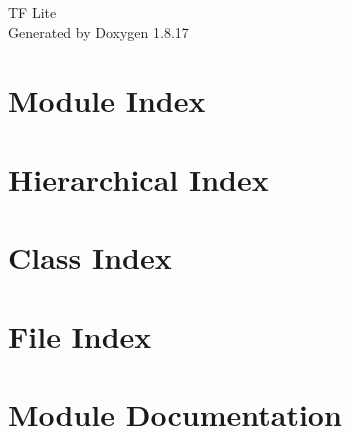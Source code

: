 \let\mypdfximage\pdfximage\def\pdfximage{\immediate\mypdfximage}\documentclass[twoside]{book}
\newcommand{\+}{\discretionary{\mbox{\scriptsize$\hookleftarrow$}}{}{}}
\newcommand{\clearemptydoublepage}{%
  \newpage{\pagestyle{empty}\cleardoublepage}%
}
\begin{document}
\hypersetup{pageanchor=false,
             bookmarksnumbered=true,
             pdfencoding=unicode
            }
\begin{titlepage}
\vspace*{7cm}
\begin{center}%
{\Large TF Lite }\\
\vspace*{1cm}
{\large Generated by Doxygen 1.8.17}\\
\end{center}
\end{titlepage}
\clearemptydoublepage
{}
\tableofcontents
\clearemptydoublepage
{}
\hypersetup{pageanchor=true}

\chapter{Module Index}

\chapter{Hierarchical Index}

\chapter{Class Index}

\chapter{File Index}

\chapter{Module Documentation}

\end{document}
